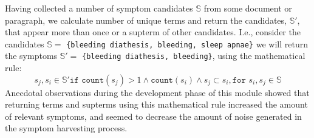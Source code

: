 \documentclass[10pt,letterpaper,draft]{article}
\begin{document}

Having collected a number of symptom candidates $\mathbb{S}$ from some
document or paragraph, we calculate number of unique terms and return
the candidates, $\mathbb{S'}$, that appear more than once or a supterm of
other candidates. I.e., consider the candidates $\mathbb{S} = $
\texttt{\{bleeding diathesis, bleeding, sleep apnae\}} we will return
the symptoms $\mathbb{S'} = $ \texttt{\{bleeding diathesis, bleeding\}},
using the mathematical rule:
\begin{equation}
 s_{j}, s_{i} \in \mathbb{S'}\texttt{if count}(s_{j}) > 1 \wedge\texttt{count}(s_{i}) \wedge s_{j} \subset s_{i}, \texttt{for } s_{i}, s_{j} \in \mathbb{S}
\end{equation}
Anecdotal observations during the development phase of this module
showed that returning terms and supterms using this mathematical rule
increased the amount of relevant symptoms, and seemed to decrease the
amount of noise generated in the symptom harvesting process.






\end{document}
